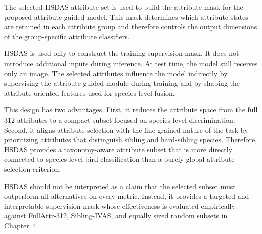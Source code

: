The selected HSDAS attribute set is used to build the attribute mask for the proposed attribute-guided model. This mask determines which attribute states are retained in each attribute group and therefore controls the output dimensions of the group-specific attribute classifiers.

HSDAS is used only to construct the training supervision mask. It does not introduce additional inputs during inference. At test time, the model still receives only an image. The selected attributes influence the model indirectly by supervising the attribute-guided module during training and by shaping the attribute-oriented features used for species-level fusion.

This design has two advantages. First, it reduces the attribute space from the full 312 attributes to a compact subset focused on species-level discrimination. Second, it aligns attribute selection with the fine-grained nature of the task by prioritizing attributes that distinguish sibling and hard-sibling species. Therefore, HSDAS provides a taxonomy-aware attribute subset that is more directly connected to species-level bird classification than a purely global attribute selection criterion.

HSDAS should not be interpreted as a claim that the selected subset must outperform all alternatives on every metric. Instead, it provides a targeted and interpretable supervision mask whose effectiveness is evaluated empirically against FullAttr-312, Sibling-IVAS, and equally sized random subsets in Chapter~4.